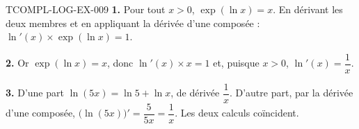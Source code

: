 \begin{corrige}{TCOMPL-LOG-EX-009}
\textbf{1.} Pour tout $x>0$, $\exp(\ln x)=x$. En dérivant les deux membres et
en appliquant la dérivée d'une composée :
$\ln'(x)\times\exp(\ln x)=1$.

\textbf{2.} Or $\exp(\ln x)=x$, donc $\ln'(x)\times x=1$ et, puisque $x>0$,
$\ln'(x)=\dfrac1x$.

\textbf{3.} D'une part $\ln(5x)=\ln5+\ln x$, de dérivée $\dfrac1x$. D'autre
part, par la dérivée d'une composée, $\big(\ln(5x)\big)'=\dfrac{5}{5x}
=\dfrac1x$. Les deux calculs coïncident.
\end{corrige}
